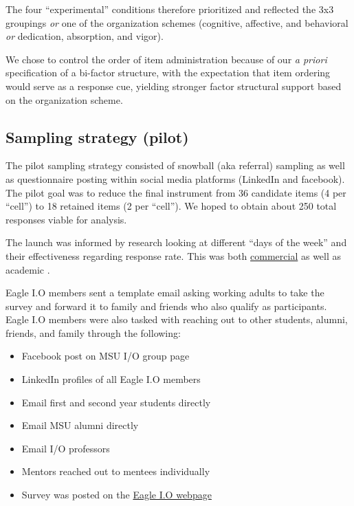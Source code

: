 \documentclass[
]{book}
\providecommand{\tightlist}{%
  \setlength{\itemsep}{0pt}\setlength{\parskip}{0pt}}
\begin{document}
The four ``experimental'' conditions therefore prioritized and reflected the 3x3 groupings \emph{or} one of the organization schemes (cognitive, affective, and behavioral \emph{or} dedication, absorption, and vigor).

We chose to control the order of item administration because of our \emph{a priori} specification of a bi-factor structure, with the expectation that item ordering would serve as a response cue, yielding stronger factor structural support based on the organization scheme.

\hypertarget{sampling-strategy-pilot}{%
\subsection{Sampling strategy (pilot)}\label{sampling-strategy-pilot}}

The pilot sampling strategy consisted of snowball (aka referral) sampling as well as questionnaire posting within social media platforms (LinkedIn and facebook). The pilot goal was to reduce the final instrument from 36 candidate items (4 per ``cell'') to 18 retained items (2 per ``cell''). We hoped to obtain about 250 total responses viable for analysis.

The launch was informed by research looking at different ``days of the week'' and their effectiveness regarding response rate. This was both \href{https://blog.hubspot.com/service/best-time-send-survey}{commercial} as well as academic \citep[e.g.,][]{anseel_response_2010}.

Eagle I.O members sent a template email asking working adults to take the survey and forward it to family and friends who also qualify as participants. Eagle I.O members were also tasked with reaching out to other students, alumni, friends, and family through the following:

\begin{itemize}
\tightlist
\item
  Facebook post on MSU I/O group page
\item
  LinkedIn profiles of all Eagle I.O members
\item
  Email first and second year students directly
\item
  Email MSU alumni directly
\item
  Email I/O professors
\item
  Mentors reached out to mentees individually
\item
  Survey was posted on the \href{https://eagle-io.weebly.com/engagement-survey.html}{Eagle I.O webpage}
\end{itemize}
\end{document}
